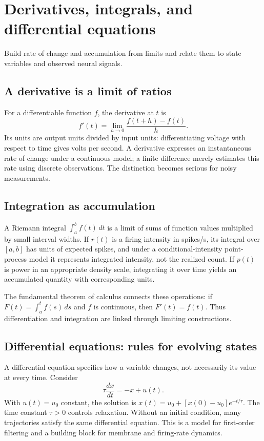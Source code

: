 \chapter{Derivatives, integrals, and differential equations}\label{ch:calculus}
\begin{readergoal}Build rate of change and accumulation from limits and relate them to state variables and observed neural signals.\end{readergoal}
\section{A derivative is a limit of ratios}
For a differentiable function $f$, the derivative at $t$ is
\[f'(t)=\lim_{h\to0}\frac{f(t+h)-f(t)}h.\]
Its units are output units divided by input units: differentiating voltage with respect to time gives volts per second. A derivative expresses an instantaneous rate of change under a continuous model; a finite difference merely estimates this rate using discrete observations. The distinction becomes serious for noisy measurements.

\section{Integration as accumulation}
A Riemann integral $\int_a^b f(t)\,dt$ is a limit of sums of function values multiplied by small interval widths. If $r(t)$ is a firing intensity in spikes/s, its integral over $[a,b]$ has units of expected spikes, and under a conditional-intensity point-process model it represents integrated intensity, not the realized count. If $p(t)$ is power in an appropriate density scale, integrating it over time yields an accumulated quantity with corresponding units.

The fundamental theorem of calculus connects these operations: if $F(t)=\int_a^t f(s)\,ds$ and $f$ is continuous, then $F'(t)=f(t)$. Thus differentiation and integration are linked through limiting constructions.

\section{Differential equations: rules for evolving states}
A differential equation specifies how a variable changes, not necessarily its value at every time. Consider
\[\tau\frac{dx}{dt}=-x+u(t).\]
With $u(t)=u_0$ constant, the solution is $x(t)=u_0+[x(0)-u_0]e^{-t/\tau}$. The time constant $\tau>0$ controls relaxation. Without an initial condition, many trajectories satisfy the same differential equation. This is a model for first-order filtering and a building block for membrane and firing-rate dynamics.

